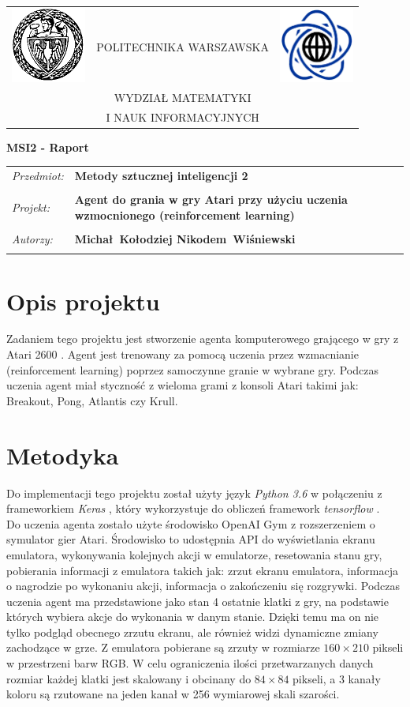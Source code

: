 \documentclass[12pt]{article}
\renewcommand{\maketitle}{
\begin{titlepage}
\begin{table}[t]
\centering
\begin{tabular}[t]{lcr}
 \includegraphics[width=70pt,height=70pt]{PW} & POLITECHNIKA WARSZAWSKA & \includegraphics[width=70pt,height=70pt]{MiNI}\\
& WYDZIAŁ MATEMATYKI & \\
& I NAUK INFORMACYJNYCH &
\end{tabular}
\end{table}
\vspace*{3cm}
  \begin{center}
    \LARGE
    \textbf {MSI2 - Raport}\\
   \vspace*{2 cm}
\begin{table}[!htp]
\begin{tabular}{p{4cm}p{9cm}}
\textit{Przedmiot:} &\textbf {Metody sztucznej inteligencji 2} \\
\\
\textit{Projekt:} &\textbf {Agent do grania w gry Atari przy użyciu uczenia wzmocnionego (reinforcement learning)} \\
\\
\textit{Autorzy:} &\textbf {Michał~Kołodziej \newline Nikodem~Wiśniewski} \\
\\
\end{tabular}
\end{table}

\vspace{5 cm}
  \center{\small Warszawa, dnia \today}
\end{center}
\end{titlepage}
}
\begin{document}
\maketitle


\section{Opis projektu}
Zadaniem tego projektu jest stworzenie agenta komputerowego grającego w gry z Atari 2600 \cite{atari}. Agent jest trenowany za pomocą uczenia przez wzmacnianie (reinforcement learning) poprzez samoczynne granie w wybrane gry. Podczas uczenia agent miał styczność z wieloma grami z konsoli Atari takimi jak: Breakout, Pong, Atlantis czy Krull.

\section{Metodyka}

Do implementacji tego projektu został użyty język \textit{Python 3.6} w połączeniu z frameworkiem \textit{Keras} \cite{keras}, który wykorzystuje do obliczeń framework \textit{tensorflow} \cite{tensorflow}. \\
Do uczenia agenta zostało użyte środowisko OpenAI Gym \cite{gym} z rozszerzeniem o symulator gier Atari. Środowisko to udostępnia API do wyświetlania ekranu emulatora, wykonywania kolejnych akcji w emulatorze, resetowania stanu gry, pobierania informacji z emulatora takich jak: zrzut ekranu emulatora, informacja o nagrodzie po wykonaniu akcji, informacja o zakończeniu się rozgrywki. Podczas uczenia agent ma przedstawione jako stan 4 ostatnie klatki z gry, na podstawie których wybiera akcje do wykonania w danym stanie. Dzięki temu ma on nie tylko podgląd obecnego zrzutu ekranu, ale również widzi dynamiczne zmiany zachodzące w grze. Z emulatora pobierane są zrzuty w rozmiarze $160\times210$ pikseli w przestrzeni barw RGB. W celu ograniczenia ilości przetwarzanych danych rozmiar każdej klatki jest skalowany i obcinany do $84\times84$ pikseli, a 3 kanały koloru są rzutowane na jeden kanał w 256 wymiarowej skali szarości.
\\\
\end{document}
